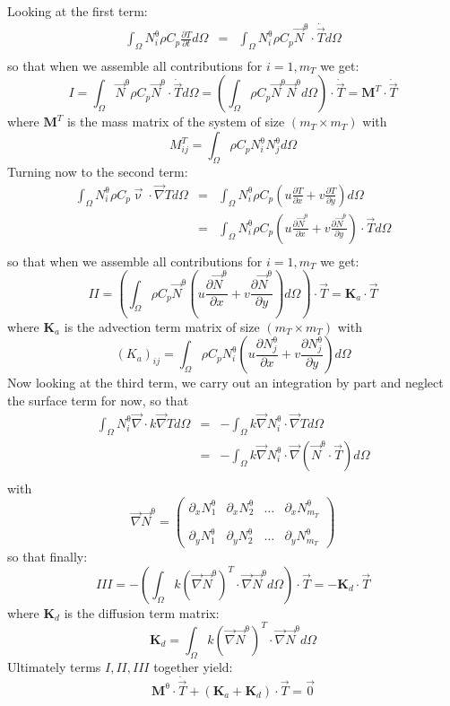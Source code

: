 Looking at the first term:
\begin{eqnarray}
\int_\Omega N^\uptheta_i  \rho C_p \frac{\partial T}{\partial t} d\Omega
&=&  \int_\Omega N^\uptheta_i  \rho C_p \vec N^\uptheta \cdot \dot{\vec T}  d\Omega \\
\end{eqnarray}
so that when we assemble all contributions for $i=1,m_T$ we get:
\[
I 
= \int_\Omega \vec N^\uptheta  \rho C_p \vec N^\uptheta \cdot \dot{\vec T}  d\Omega
= \left( \int_\Omega \rho C_p  \vec N^\uptheta  \vec N^\uptheta  d\Omega \right) \cdot \dot{\vec T}
= {\bm M}^T \cdot \dot{\vec T}
 \]
where ${\bm M}^T$ is the mass matrix of the system of size $(m_T \times m_T)$ with 
\[
M_{ij}^T = \int_\Omega \rho C_p N_i^\uptheta N_j^\uptheta d\Omega
\]
Turning now to the second term:
\begin{eqnarray}
\int_\Omega N^\uptheta_i  \rho C_p  {\vec \upnu}\cdot {\vec\nabla T}   d\Omega
&=& \int_\Omega N^\uptheta_i  \rho C_p (u \frac{\partial T}{\partial x} +  v \frac{\partial T}{\partial y} ) d\Omega \\
&=& \int_\Omega N^\uptheta_i  \rho C_p (u \frac{\partial \vec N^\uptheta}{\partial x} +  v \frac{\partial \vec N^\uptheta}{\partial y} ) \cdot \vec T d\Omega \\
\end{eqnarray}
so that when we assemble all contributions for $i=1,m_T$ we get:
\[
II = \left(\int_\Omega \rho C_p \vec N^\uptheta (u \frac{\partial \vec N^\uptheta}{\partial x} +  v \frac{\partial \vec N^\uptheta}{\partial y} ) d\Omega \right)  \cdot \vec T = {\bm K}_a \cdot \vec T
\]
where ${\bm K}_a$ is the advection term matrix of size $(m_T \times m_T)$ with
\[
(K_a)_{ij} = \int_\Omega \rho C_p N_i^\uptheta 
\left(u \frac{\partial N_j^\uptheta}{\partial x} +  v \frac{\partial N_j^\uptheta}{\partial y} \right) d\Omega 
\]
Now looking at the third term, we carry out an integration by part and neglect the surface term for now, so that 
\begin{eqnarray}
\int_\Omega  N^\uptheta_i {\vec \nabla} \cdot k \vec\nabla T d\Omega
&=& - \int_\Omega  k \vec \nabla N^\uptheta_i \cdot \vec\nabla T d\Omega \\
&=& - \int_\Omega  k \vec \nabla N^\uptheta_i \cdot \vec\nabla (\vec N^\uptheta \cdot \vec T) d\Omega \\
\end{eqnarray}
with 
\[
\vec \nabla \vec N^\uptheta = 
\left(
\begin{array}{cccc}
\partial_x N_1^\uptheta & 
\partial_x N_2^\uptheta & \dots &
\partial_x N_{m_T}^\uptheta \\ \\
\partial_y N_1^\uptheta & 
\partial_y N_2^\uptheta & \dots &
\partial_y N_{m_T}^\uptheta 
\end{array}
\right)
\]
so that finally:
\[
III = - \left( \int_\Omega k (\vec \nabla \vec N^\uptheta)^T \cdot \vec \nabla \vec N^\uptheta d\Omega \right) \cdot \vec T
= - {\bm K}_d \cdot \vec T
\]
where ${\bm K}_d$ is the diffusion term matrix:
\[
{\bm K}_d = \int_\Omega  k (\vec \nabla \vec N^\uptheta)^T \cdot \vec \nabla \vec N^\uptheta d\Omega 
\]
 Ultimately terms $I,II,III$ together yield:
\[
\boxed{
{\bm M}^\uptheta \cdot \dot{\vec T} + ({\bm K}_a + {\bm K}_d) \cdot \vec T = \vec 0
}
\]

